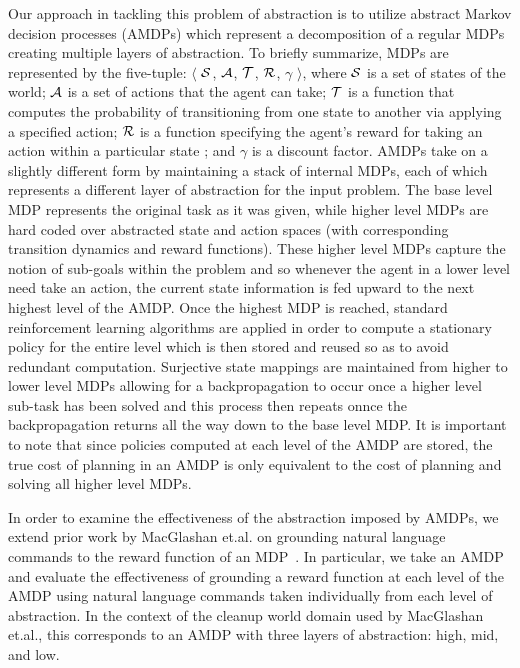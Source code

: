 \documentclass[conference]{IEEEtran}
\begin{document}
Our approach in tackling this problem of abstraction is to utilize abstract Markov decision processes (AMDPs) which represent a decomposition of a regular MDPs creating multiple layers of abstraction. To briefly summarize, MDPs are represented by the five-tuple: $\langle$ ${\cal S}$, ${\cal A}$, ${\cal T}$, ${\cal R}$, $\gamma$ $\rangle$, where ${\cal S}$ is a set of states of the world; ${\cal A}$ is a set of actions that the agent can take; ${\cal T}$ is a function that computes the probability of transitioning from one state to another via applying a specified action; ${\cal R}$ is a function specifying the agent's reward for taking an action within a particular state ; and $\gamma$ is a discount factor. AMDPs take on a slightly different form by maintaining a stack of internal MDPs, each of which represents a different layer of abstraction for the input problem. The base level MDP represents the original task as it was given, while higher level MDPs are hard coded over abstracted state and action spaces (with corresponding transition dynamics and reward functions). These higher level MDPs capture the notion of sub-goals within the problem and so whenever the agent in a lower level need take an action, the current state information is fed upward to the next highest level of the AMDP. Once the highest MDP is reached, standard reinforcement learning algorithms are applied in order to compute a stationary policy for the entire level which is then stored and reused so as to avoid redundant computation. Surjective state mappings are maintained from higher to lower level MDPs allowing for a backpropagation to occur once a higher level sub-task has been solved and this process then repeats onnce the backpropagation returns all the way down to the base level MDP. It is important to note that since policies computed at each level of the AMDP are stored, the true cost of planning in an AMDP is only equivalent to the cost of planning and solving all higher level MDPs.

In order to examine the effectiveness of the abstraction imposed by AMDPs, we extend prior work by MacGlashan et.al. on grounding natural language commands to the reward function of an MDP~\cite{MacGlashan2015GroundingEC}. In particular, we take an AMDP and evaluate the effectiveness of grounding a reward function at each level of the AMDP using natural language commands taken individually from each level of abstraction. In the context of the cleanup world domain used by MacGlashan et.al., this corresponds to an AMDP with three layers of abstraction: high, mid, and low.
\end{document}
